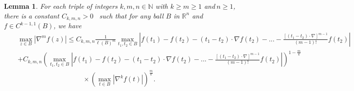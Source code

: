 \documentclass{amsart}
\theoremstyle{plain}
\newtheorem{lemma}[theorem]{Lemma}
\numberwithin{equation}{section}
\begin{document}
\begin{lemma}
\label{first high}For each triple of integers $k,m,n\in \mathbb{N}$ with $%
k\geq m\geq 1$ and$\ n\geq 1$, there is a constant $C_{k,m,n}>0$ \ such that
for any ball $B$ in $\mathbb{R}^{n}$ and $f\in C^{k-1,1}\left( B\right) $,
we have%
\begin{eqnarray*}
&&\max_{z\in B}\left\vert \nabla ^{m}f\left( z\right) \right\vert \leq
C_{k,m,n}\frac{1}{\ell \left( B\right) ^{m}}\max_{t_{1},t_{2}\in
B}\left\vert f\left( t_{1}\right) -f\left( t_{2}\right) -\left(
t_{1}-t_{2}\right) \cdot \nabla f\left( t_{2}\right) -...-\frac{\left[
\left( t_{1}-t_{2}\right) \cdot \nabla \right] ^{m-1}}{\left( m-1\right) !}%
f\left( t_{2}\right) \right\vert \\
&&+C_{k,m,n}\left( \max_{t_{1},t_{2}\in B}\left\vert f\left( t_{1}\right)
-f\left( t_{2}\right) -\left( t_{1}-t_{2}\right) \cdot \nabla f\left(
t_{2}\right) -...-\frac{\left[ \left( t_{1}-t_{2}\right) \cdot \nabla \right]
^{m-1}}{\left( m-1\right) !}f\left( t_{2}\right) \right\vert \right) ^{1-%
\frac{m}{k}} \\
&&\ \ \ \ \ \ \ \ \ \ \ \ \ \ \ \ \ \ \ \ \ \ \ \ \ \ \ \ \ \ \ \ \ \ \ \ \
\ \ \ \ \ \ \times \left( \max_{t\in B}\left\vert \nabla ^{k}f\left(
t\right) \right\vert \right) ^{\frac{m}{k}}.
\end{eqnarray*}
\end{lemma}
\end{document}
